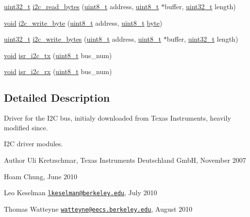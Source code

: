 \begin{DoxyCompactItemize}
\hyperlink{_p_e___types_8h_a33594304e786b158f3fb30289278f5af}{uint32\+\_\+t} \hyperlink{group___i2_c_ga6c5d53542049a3b17a6c0f5c42b3f9f7}{i2c\+\_\+read\+\_\+bytes} (\hyperlink{_p_e___types_8h_aba7bc1797add20fe3efdf37ced1182c5}{uint8\+\_\+t} address, \hyperlink{_p_e___types_8h_aba7bc1797add20fe3efdf37ced1182c5}{uint8\+\_\+t} $\ast$buffer, \hyperlink{_p_e___types_8h_a33594304e786b158f3fb30289278f5af}{uint32\+\_\+t} length)
\item 
\hyperlink{usb__devapi_8h_afabf60e7f57651d6d595a02c75f07cd0}{void} \hyperlink{group___i2_c_ga6d9ff5e4b9a1909ada86224581be53b4}{i2c\+\_\+write\+\_\+byte} (\hyperlink{_p_e___types_8h_aba7bc1797add20fe3efdf37ced1182c5}{uint8\+\_\+t} address, \hyperlink{_p_e___types_8h_aba7bc1797add20fe3efdf37ced1182c5}{uint8\+\_\+t} \hyperlink{_p_e___types_8h_a0c8186d9b9b7880309c27230bbb5e69d}{byte})
\item 
\hyperlink{_p_e___types_8h_a33594304e786b158f3fb30289278f5af}{uint32\+\_\+t} \hyperlink{group___i2_c_ga2842bfa37d44e63d1777822400677387}{i2c\+\_\+write\+\_\+bytes} (\hyperlink{_p_e___types_8h_aba7bc1797add20fe3efdf37ced1182c5}{uint8\+\_\+t} address, \hyperlink{_p_e___types_8h_aba7bc1797add20fe3efdf37ced1182c5}{uint8\+\_\+t} $\ast$buffer, \hyperlink{_p_e___types_8h_a33594304e786b158f3fb30289278f5af}{uint32\+\_\+t} length)
\item 
\hyperlink{usb__devapi_8h_afabf60e7f57651d6d595a02c75f07cd0}{void} \hyperlink{group___i2_c_gaec8c11d47885868ae7931ad990d5db74}{isr\+\_\+i2c\+\_\+tx} (\hyperlink{_p_e___types_8h_aba7bc1797add20fe3efdf37ced1182c5}{uint8\+\_\+t} bus\+\_\+num)
\item 
\hyperlink{usb__devapi_8h_afabf60e7f57651d6d595a02c75f07cd0}{void} \hyperlink{group___i2_c_gab51d1ed9826f852ce34df92b6ab3bab5}{isr\+\_\+i2c\+\_\+rx} (\hyperlink{_p_e___types_8h_aba7bc1797add20fe3efdf37ced1182c5}{uint8\+\_\+t} bus\+\_\+num)
\end{DoxyCompactItemize}


\subsection{Detailed Description}
Driver for the I2C bus, initialy downloaded from Texas Instruments, heavily modified since. 

I2C driver modules.

\begin{DoxyAuthor}{Author}
Uli Kretzschmar, Texas Instruments Deutschland GmbH, November 2007 

Hoam Chung, June 2010 

Leo Keselman \href{mailto:lkeselman@berkeley.edu}{\tt lkeselman@berkeley.\+edu}, July 2010 

Thomas Watteyne \href{mailto:watteyne@eecs.berkeley.edu}{\tt watteyne@eecs.\+berkeley.\+edu}, August 2010 
\end{DoxyAuthor}


